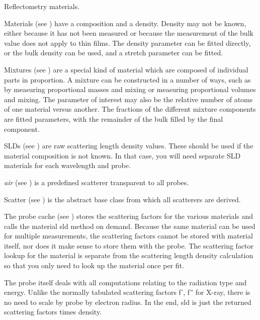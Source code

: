\documentclass[letterpaper,10pt,english]{sphinxmanual}
\begin{document}
\label{api/material:module-refl1d.material}
Reflectometry materials.

Materials (see {\hyperref[api/material:refl1d.material.Material]{}}) have a composition and a density.
Density may not be known, either because it has not been measured or
because the measurement of the bulk value does not apply to thin films.
The density parameter can be fitted directly, or the bulk density can be
used, and a stretch parameter can be fitted.

Mixtures (see {\hyperref[api/material:refl1d.material.Mixture]{}}) are a special kind of material which are
composed of individual parts in proportion.  A mixture can be constructed
in a number of ways, such as by measuring proportional masses and mixing
or measuring proportional volumes and mixing.  The parameter of interest
may also be the relative number of atoms of one material versus another.
The fractions of the different mixture components are fitted parameters,
with the remainder of the bulk filled by the final component.

SLDs (see {\hyperref[api/material:refl1d.material.SLD]{}}) are raw scattering length density values.  These
should be used if the material composition is not known.  In that case,
you will need separate SLD materials for each wavelength and probe.

\emph{air} (see {\hyperref[api/material:refl1d.material.Vacuum]{}}) is a predefined scatterer transparent to
all probes.

Scatter (see {\hyperref[api/material:refl1d.material.Scatterer]{}}) is the abstract base class from which
all scatterers are derived.

The probe cache (see {\hyperref[api/material:refl1d.material.ProbeCache]{}}) stores the scattering factors
for the various materials and calls the material sld method on demand.
Because the same material can be used for multiple measurements, the
scattering factors cannot be stored with material itself, nor does it
make sense to store them with the probe.  The scattering factor lookup
for the material is separate from the scattering length density
calculation so that you only need to look up the material once per fit.

The probe itself deals with all computations relating to the radiation
type and energy.  Unlike the normally tabulated scattering factors f', f''
for X-ray, there is no need to scale by probe by electron radius.  In
the end, sld is just the returned scattering factors times density.
\end{document}
